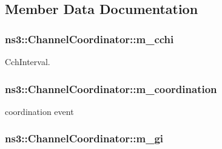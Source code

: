 \subsection{Member Data Documentation}
\subsubsection[{\texorpdfstring{m\+\_\+cchi}{m_cchi}}]{ ns3\+::\+Channel\+Coordinator\+::m\+\_\+cchi\hspace{0.3cm}{\ttfamily [private]}}\hypertarget{classns3_1_1ChannelCoordinator_a75d1781ca3ccc192c2f9bf596f6e1adf}{}\label{classns3_1_1ChannelCoordinator_a75d1781ca3ccc192c2f9bf596f6e1adf}


Cch\+Interval. 

\subsubsection[{\texorpdfstring{m\+\_\+coordination}{m_coordination}}]{ ns3\+::\+Channel\+Coordinator\+::m\+\_\+coordination\hspace{0.3cm}{\ttfamily [private]}}\hypertarget{classns3_1_1ChannelCoordinator_aa4df0d5519c0aa65173f0c3276fa44a5}{}\label{classns3_1_1ChannelCoordinator_aa4df0d5519c0aa65173f0c3276fa44a5}


coordination event 

\subsubsection[{\texorpdfstring{m\+\_\+gi}{m_gi}}]{ ns3\+::\+Channel\+Coordinator\+::m\+\_\+gi\hspace{0.3cm}{\ttfamily [private]}}\hypertarget{classns3_1_1ChannelCoordinator_a65c0f76d8de9190aa42bddb71f47a624}{}\label{classns3_1_1ChannelCoordinator_a65c0f76d8de9190aa42bddb71f47a624}


